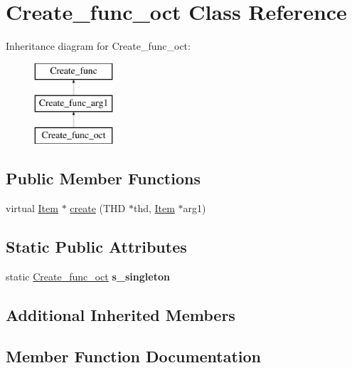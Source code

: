 \hypertarget{classCreate__func__oct}{}\section{Create\+\_\+func\+\_\+oct Class Reference}
\label{classCreate__func__oct}
Inheritance diagram for Create\+\_\+func\+\_\+oct\+:\begin{figure}[H]
\begin{center}
\leavevmode
\includegraphics[height=3.000000cm]{classCreate__func__oct}
\end{center}
\end{figure}
\subsection*{Public Member Functions}
\begin{DoxyCompactItemize}
\item 
virtual \mbox{\hyperlink{classItem}{Item}} $\ast$ \mbox{\hyperlink{classCreate__func__oct_a735dcc22d1b73d13d53ed1acec8bfc2b}{create}} (T\+HD $\ast$thd, \mbox{\hyperlink{classItem}{Item}} $\ast$arg1)
\end{DoxyCompactItemize}
\subsection*{Static Public Attributes}
\begin{DoxyCompactItemize}
\item 
\mbox{\label{classCreate__func__oct_a2167b95772b1545abc008b8e0b4129e9}} 
static \mbox{\hyperlink{classCreate__func__oct}{Create\+\_\+func\+\_\+oct}} {\bfseries s\+\_\+singleton}
\end{DoxyCompactItemize}
\subsection*{Additional Inherited Members}


\subsection{Member Function Documentation}
\mbox{\label{classCreate__func__oct_a735dcc22d1b73d13d53ed1acec8bfc2b}} 
